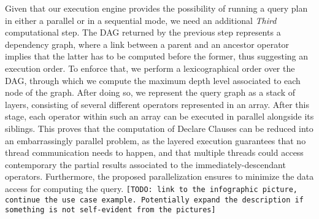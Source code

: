 Given that our execution engine provides the possibility of running a query plan in either a parallel or in a sequential mode, we need   an additional \textit{Third} computational step. The DAG returned by the previous step represents a dependency graph, where a link between a parent and an ancestor operator implies that the latter has to be computed before the former, thus suggesting an execution order. To enforce that, we perform a lexicographical order over the DAG, through which we compute the maximum depth level associated to each node of the graph. After doing so, we represent the query graph as a stack of layers, consisting of several different operators represented in an array. After this stage, each operator within such an array can be executed in parallel alongside its siblings. This proves that the computation of Declare Clauses can be reduced into an embarrassingly parallel problem, as the layered execution guarantees that no thread communication needs to happen, and that multiple threads could access contemporary the partial results associated to the immediately-descendant operators. Furthermore, the proposed parallelization ensures to minimize the data access for computing the query. \texttt{\color{red}[TODO: link to the infographic picture, continue the use case example. Potentially expand the description if something is not self-evident from the pictures]}
